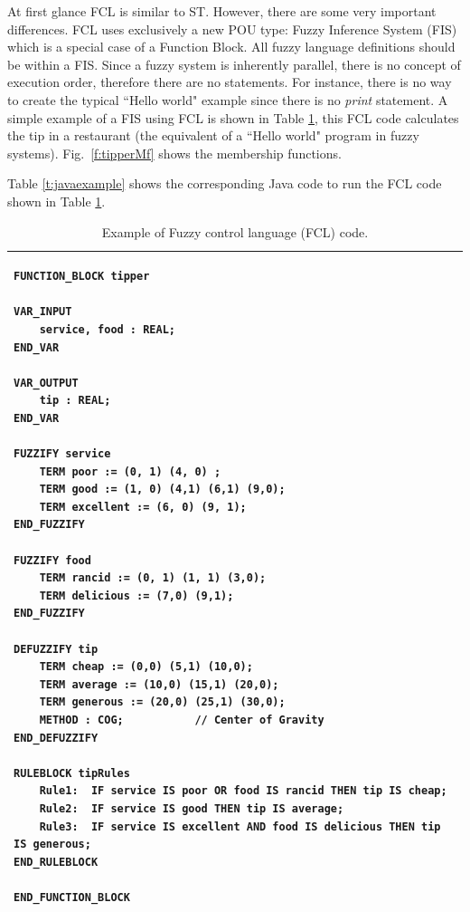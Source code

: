 \documentclass[conference]{IEEEtran}
\begin{document}
At first glance FCL is similar to ST. 
However, there are some very important differences. FCL uses exclusively a new POU type: Fuzzy Inference System (FIS) which is a special case of a Function Block. 
All fuzzy language definitions should be within a FIS. Since a fuzzy system is inherently parallel, there is no concept of execution order, therefore there are no statements. 
For instance, there is no way to create the typical ``Hello world" example since there is no \textit{print} statement. 
A simple example of a FIS using FCL is shown in Table \ref{t:example}, this FCL code calculates the tip in a restaurant (the equivalent of a ``Hello world" program in fuzzy systems). Fig.~\ref{f:tipperMf} shows the membership functions.

Table \ref{t:javaexample} shows the corresponding Java code to run the FCL code shown in Table \ref{t:example}.

\begin{table}[!t]
\caption{Example of Fuzzy control language (FCL) code.}
\label{t:example}
\centering
\begin{tabular}{|l|}
\hline
\begin{lstlisting}
FUNCTION_BLOCK tipper

VAR_INPUT				
	service, food : REAL;
END_VAR

VAR_OUTPUT
	tip : REAL;
END_VAR

FUZZIFY service
	TERM poor := (0, 1) (4, 0) ;
	TERM good := (1, 0) (4,1) (6,1) (9,0);
	TERM excellent := (6, 0) (9, 1);
END_FUZZIFY

FUZZIFY food
	TERM rancid := (0, 1) (1, 1) (3,0);
	TERM delicious := (7,0) (9,1);
END_FUZZIFY

DEFUZZIFY tip
	TERM cheap := (0,0) (5,1) (10,0);
	TERM average := (10,0) (15,1) (20,0);
	TERM generous := (20,0) (25,1) (30,0);
	METHOD : COG;			// Center of Gravity
END_DEFUZZIFY

RULEBLOCK tipRules
	Rule1:	IF service IS poor OR food IS rancid THEN tip IS cheap;
	Rule2:	IF service IS good THEN tip IS average;
	Rule3:	IF service IS excellent AND food IS delicious THEN tip IS generous;
END_RULEBLOCK

END_FUNCTION_BLOCK
\end{lstlisting} \\
\hline
\end{tabular}
\end{table}
\end{document}
